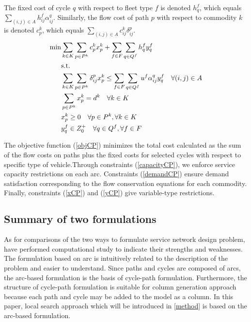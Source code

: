 \documentclass[11pt,nonblindrev,fleqn]{article}
\begin{document}
The fixed cost of cycle $q$ with respect to fleet type $f$ is denoted $h_q^f$, which equals $\sum_{(i,j)\in A} h_{ij}^f \alpha_{ij}^q$. Similarly, the flow cost of path $p$ with respect to commodity $k$ is denoted $c_p^k$, which equals $\sum_{(i,j)\in A} c_{ij}^k \delta_{ij}^p$.
\begin{align}
  \min &    \sum_{k\in K}\sum_{p\in P^k}c_p^k x_p^k +  \sum_{f\in F}\sum_{q\in Q^f}h_q^f y_q^f  \label{objCP}    \\
         & \rm{s.t.} \nonumber \\
         &     \sum_{k\in K}\sum_{p\in P^k}\delta_{ij}^p x_p^k \leq  \sum_{f\in F}\sum_{q\in Q^f}u^f \alpha_{ij}^q y_q^f      \quad \forall (i,j)\in A \label{capacityCP}\\
         &     \sum_{p\in P^k}x_p^k = d^k      \quad       \forall k\in K  \label{demandCP}    \\
         &      x_p^k \geq 0        \quad       \forall p\in P^k,\forall k\in K     \label{xCP} \\
         &      y_q^f \in Z_0^+     \quad       \forall q\in Q^f, \forall f\in F    \label{yCP}
\end{align}

The objective function (\ref{objCP}) minimizes the total cost calculated as the sum of the flow costs on paths plus the fixed costs for selected cycles with respect to specific type of vehicle.Through constraints (\ref{capacityCP}), we enforce service capacity restrictions on each arc. Constraints (\ref{demandCP}) ensure demand satisfaction corresponding to the flow conservation equations for each commodity. Finally, constraints (\ref{xCP}) and (\ref{yCP}) give variable-type restrictions.

\subsection{Summary of two formulations}
As for comparisons of the two ways to formulate service network design problem, \cite{Andersen2009bService} have performed computational study to indicate their strengths and weaknesses. The formulation based on arc is intuitively related to the description of the problem and easier to understand. Since paths and cycles are composed of arcs, the arc-based formulation is the basis of cycle-path formulation. Furthermore, the structure of cycle-path formulation is suitable for column generation approach because each path and cycle may be added to the model as a column. In this paper, local search approach which will be introduced in \autoref{method} is based on the arc-based formulation.
\end{document}
